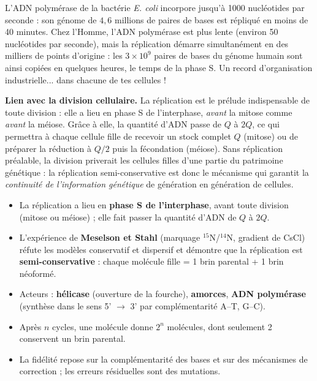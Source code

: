 \documentclass[11pt]{article}
\begin{document}
\begin{savaistu}
L'ADN polymérase de la bactérie \emph{E. coli} incorpore jusqu'à \num{1000} nucléotides par seconde : son génome de $4{,}6$ millions de paires de bases est répliqué en moins de 40 minutes. Chez l'Homme, l'ADN polymérase est plus lente (environ 50 nucléotides par seconde), mais la réplication démarre simultanément en des milliers de points d'origine : les $3 \times 10^{9}$ paires de bases du génome humain sont ainsi copiées en quelques heures, le temps de la phase S. Un record d'organisation industrielle... dans chacune de tes cellules !
\end{savaistu}

\textbf{Lien avec la division cellulaire.} La réplication est le prélude indispensable de toute division : elle a lieu en phase S de l'interphase, \emph{avant} la mitose comme \emph{avant} la méiose. Grâce à elle, la quantité d'ADN passe de $Q$ à $2Q$, ce qui permettra à chaque cellule fille de recevoir un stock complet $Q$ (mitose) ou de préparer la réduction à $Q/2$ puis la fécondation (méiose). Sans réplication préalable, la division priverait les cellules filles d'une partie du patrimoine génétique : la réplication semi-conservative est donc le mécanisme qui garantit la \emph{continuité de l'information génétique} de génération en génération de cellules.

\begin{aretenir}
\begin{itemize}
\item La réplication a lieu en \textbf{phase S de l'interphase}, avant toute division (mitose ou méiose) ; elle fait passer la quantité d'ADN de $Q$ à $2Q$.
\item L'expérience de \textbf{Meselson et Stahl} (marquage $^{15}$N/$^{14}$N, gradient de CsCl) réfute les modèles conservatif et dispersif et démontre que la réplication est \textbf{semi-conservative} : chaque molécule fille = 1 brin parental + 1 brin néoformé.
\item Acteurs : \textbf{hélicase} (ouverture de la fourche), \textbf{amorces}, \textbf{ADN polymérase} (synthèse dans le sens 5' $\rightarrow$ 3' par complémentarité A--T, G--C).
\item Après $n$ cycles, une molécule donne $2^{n}$ molécules, dont seulement 2 conservent un brin parental.
\item La fidélité repose sur la complémentarité des bases et sur des mécanismes de correction ; les erreurs résiduelles sont des mutations.
\end{itemize}
\end{aretenir}
\end{document}
